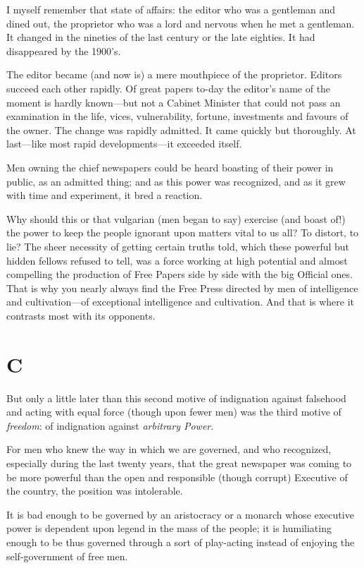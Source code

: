 \documentclass{book}
\begin{document}
I myself remember that state of affairs: the editor who was a gentleman and dined out, the proprietor who was a lord and nervous when he met a gentleman. It changed in the nineties of the last century or the late eighties. It had disappeared by the 1900’s.

The editor became (and now is) a mere mouthpiece of the proprietor. Editors succeed each other rapidly. Of great papers to-day the editor’s name of the moment is hardly known—but not a Cabinet Minister that could not pass an examination in the life, vices, vulnerability, fortune, investments and favours of the owner. The change was rapidly admitted. It came quickly but thoroughly. At last—like most rapid developments—it exceeded itself.

Men owning the chief newspapers could be heard boasting of their power in public, as an admitted thing; and as this power was recognized, and as it grew with time and experiment, it bred a reaction.

Why should this or that vulgarian (men began to say) exercise (and boast of!) the power to keep the people ignorant upon matters vital to us all? To distort, to lie? The sheer necessity of getting certain truths told, which these powerful but hidden fellows refused to tell, was a force working at high potential and almost compelling the production of Free Papers side by side with the big Official ones. That is why you nearly always find the Free Press directed by men of intelligence and cultivation—of exceptional intelligence and cultivation. And that is where it contrasts most with its opponents.

\section*{C}
But only a little later than this second motive of indignation against falsehood and acting with equal force (though upon fewer men) was the third motive of \emph{freedom}: of indignation against \emph{arbitrary Power}.

For men who knew the way in which we are governed, and who recognized, especially during the last twenty years, that the great newspaper was coming to be more powerful than the open and responsible (though corrupt) Executive of the country, the position was intolerable.

It is bad enough to be governed by an aristocracy or a monarch whose executive power is dependent upon legend in the mass of the people; it is humiliating enough to be thus governed through a sort of play-acting instead of enjoying the self-government of free men.
\end{document}
